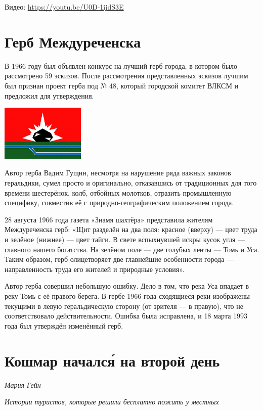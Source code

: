 Видео: \url{https://youtu.be/U0D-1ijdS3E}




\newpage
\section{Герб Междуреченска}
В 1966 году был объявлен конкурс на лучший герб города, в котором было рассмотрено 59 эскизов. После рассмотрения представленных эскизов лучшим был признан проект герба под № 48, который городской комитет ВЛКСМ и предложил для утверждения.

\includegraphics[width=0.3\textwidth]{img/Flag_of_Mezhdurechensk_(Kemerovo_oblast).png}

Автор герба Вадим Гущин, несмотря на нарушение ряда важных законов геральдики, сумел просто и оригинально, отказавшись от традиционных для того времени шестерёнок, колб, отбойных молотков, отразить промышленную специфику, совместив её с природно-географическим положением города.

28 августа 1966 года газета «Знамя шахтёра» представила жителям Междуреченска герб: «Щит разделён на два поля: красное (вверху) — цвет труда и зелёное (нижнее) — цвет тайги. В свете вспыхнувшей искры кусок угля — главного нашего богатства. На зелёном поле — две голубых ленты — Томь и Уса. Таким образом, герб олицетворяет две главнейшие особенности города — направленность труда его жителей и природные условия».

Автор герба совершил небольшую ошибку. Дело в том, что река Уса впадает в реку Томь с её правого берега. В гербе 1966 года сходящиеся реки изображены текущими в левую геральдическую сторону (от зрителя — в правую), что не соответствовало действительности. Ошибка была исправлена, и 18 марта 1993 года был утверждён изменённый герб.


\section{Кошмар началс\'{я} на второй день}

\textit{Мария Гейн}

\textit{Истории туристов, которые решили бесплатно пожить у местных}


